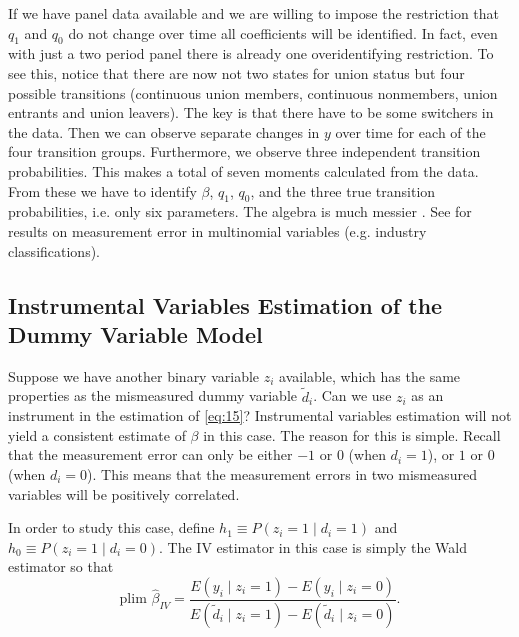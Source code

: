 \documentclass[12pt]{article}
\begin{document}
If we have panel data available and we are willing to impose the restriction that $q_1$ and $q_0$ do not change over time all coefficients will be identified. In fact, even with just a two period panel there is already one overidentifying restriction. To see this, notice that there are now not two states for union status but four possible transitions (continuous union members, continuous nonmembers, union entrants and union leavers). The key is that there have to be some switchers in the data. Then we can observe separate changes in $y$ over time for each of the four transition groups. Furthermore, we observe three independent transition probabilities. This makes a total of seven moments calculated from the data. From these we have to identify $\beta$, $q_1$, $q_0$, and the three true transition probabilities, i.e. only six parameters. The algebra is much messier \cite{Card_1996}. See \cite{Krueger_Summers_1988} for results on measurement error in multinomial variables (e.g. industry classifications).

\subsection*{Instrumental Variables Estimation of the Dummy Variable Model}
Suppose we have another binary variable $z_i$ available, which has the same properties as the mismeasured dummy variable $\tilde{d}_i$. Can we use $z_i$ as an instrument in the estimation of \eqref{eq:15}? Instrumental variables estimation will not yield a consistent estimate of $\beta$ in this case. The reason for this is simple. Recall that the measurement error can only be either $-1$ or $0$ (when $d_i = 1$), or $1$ or $0$ (when $d_i = 0$). This means that the measurement errors in two mismeasured variables will be positively correlated.

In order to study this case, define $h_1 \equiv P(z_i = 1 \mid d_i = 1)$ and $h_0 \equiv P(z_i = 1 \mid d_i = 0)$. The IV estimator in this case is simply the Wald estimator so that
\begin{equation}
\label{eq:17}
\text{plim } \hat{\beta}_{IV} = \frac{E(y_i \mid z_i = 1) - E(y_i \mid z_i = 0)}{E(\tilde{d}_i \mid z_i = 1) - E(\tilde{d}_i \mid z_i = 0)}.
\end{equation}
\end{document}
